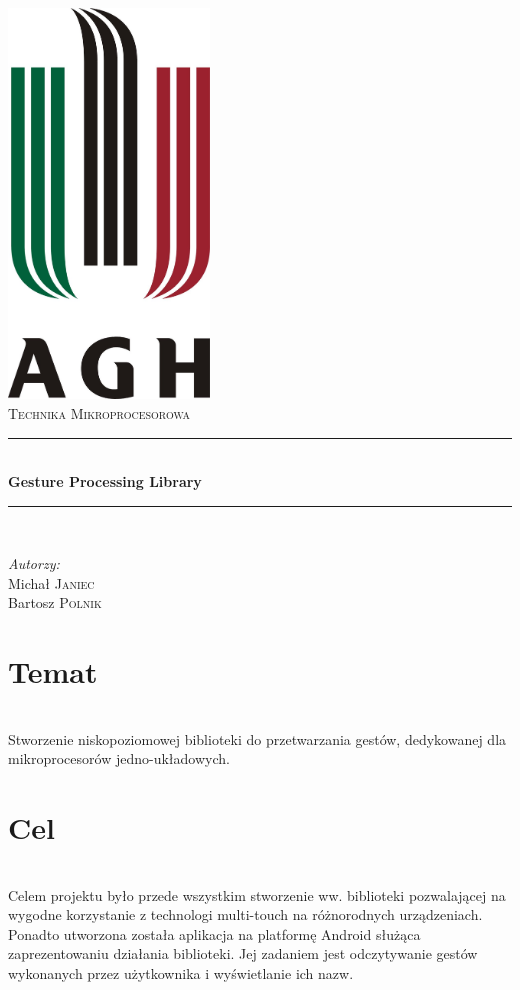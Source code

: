 \documentclass[a4paper,12pt]{article}
\newcommand{\HRule}{\rule{\linewidth}{0.5mm}}
\begin{document}
\begin{titlepage}
	\begin{center}
		\includegraphics[width=0.4\textwidth]{../data/logo} \\[1cm]
		\textsc{\LARGE Technika Mikroprocesorowa} \\[0.8cm]
		\HRule \\[0.4cm]
		{ \huge \bfseries Gesture Processing Library} \\[0.4cm]
		\HRule \\[1.5cm]
	\end{center}
	\begin{minipage}{0.4\textwidth}
		\begin{flushleft} \large
		\emph{Autorzy:} \\
		Michał \textsc{Janiec} \\
		Bartosz \textsc{Polnik}
		\end{flushleft}
	\end{minipage}
\end{titlepage}
\thispagestyle{empty}

\tableofcontents

\section{Temat} \ \\[0.1cm]
\indent Stworzenie niskopoziomowej biblioteki do przetwarzania gestów, dedykowanej dla mikroprocesorów jedno-układowych.

\section{Cel} \ \\[0.1cm]
\indent Celem projektu było przede wszystkim stworzenie ww. biblioteki pozwalającej na wygodne korzystanie z technologi multi-touch na różnorodnych urządzeniach. Ponadto utworzona została aplikacja na platformę Android służąca zaprezentowaniu działania biblioteki. Jej zadaniem jest odczytywanie gestów wykonanych przez użytkownika i wyświetlanie ich nazw.
\end{document}
